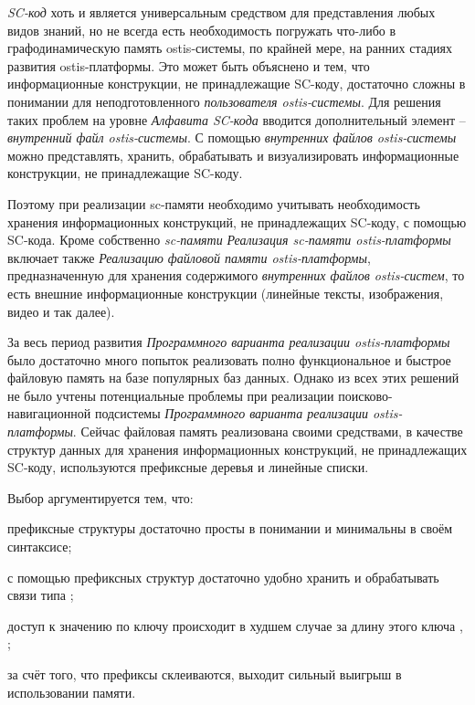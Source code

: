 \bigskip

\textit{SC-код} хоть и является универсальным средством для представления любых видов знаний, но не всегда есть необходимость погружать что-либо в графодинамическую память ostis-системы, по крайней мере, на ранних стадиях развития ostis-платформы. Это может быть объяснено и тем, что информационные конструкции, не принадлежащие SC-коду, достаточно сложны в понимании для неподготовленного \textit{пользователя ostis-системы}. Для решения таких проблем на уровне \textit{Алфавита SC-кода\scnsupergroupsign} вводится дополнительный элемент -- \textit{внутренний файл ostis-системы}. С помощью \textit{внутренних файлов ostis-системы} можно представлять, хранить, обрабатывать и визуализировать информационные конструкции, не принадлежащие SC-коду.

Поэтому при реализации sc-памяти необходимо учитывать необходимость хранения информационных конструкций, не принадлежащих SC-коду, с помощью SC-кода. Кроме собственно \textit{sc-памяти} \textit{Реализация sc-памяти ostis-платформы} включает также \textit{Реализацию файловой памяти ostis-платформы}, предназначенную для хранения содержимого \textit{внутренних файлов ostis-систем}, то есть внешние информационные конструкции (линейные тексты, изображения, видео и так далее).

За весь период развития \textit{Программного варианта реализации ostis-платформы} было достаточно много попыток реализовать полно функциональное и быстрое файловую память на базе популярных баз данных. Однако из всех этих решений не было учтены потенциальные проблемы при реализации поисково-навигационной подсистемы \textit{Программного варианта реализации ostis-платформы}. Сейчас файловая память реализована своими средствами, в качестве структур данных для хранения информационных конструкций, не принадлежащих SC-коду, используются префиксные деревья  и линейные списки.

Выбор аргументируется тем, что:
\begin{textitemize}
    \item префиксные структуры достаточно просты в понимании и минимальны в своём синтаксисе;
    \item с помощью префиксных структур достаточно удобно хранить и обрабатывать связи типа ;
    \item доступ к значению по ключу происходит в худшем случае за длину этого ключа \cite{tsuruta2022cPrefixTree}, ;
    \item за счёт того, что префиксы склеиваются, выходит сильный выигрыш в использовании памяти.
\end{textitemize}

